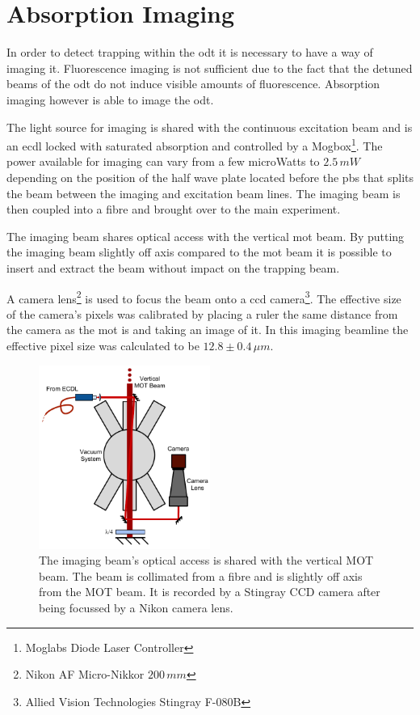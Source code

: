 \section{Absorption Imaging}

In order to detect trapping within the \gls{odt} it is necessary to have a way of imaging it. Fluorescence imaging is not sufficient due to the fact that the detuned beams of the \gls{odt} do not induce visible amounts of fluorescence. Absorption imaging however is able to image the \gls{odt}.

The light source for imaging is shared with the continuous excitation beam and is an \gls{ecdl} locked with saturated absorption and controlled by a Mogbox\footnote{Moglabs Diode Laser Controller}. The power available for imaging can vary from a few microWatts to $2.5\,\unit{mW}$ depending on the position of the half wave plate located before the \gls{pbs} that splits the beam between the imaging and excitation beam lines. The imaging beam is then coupled into a fibre and brought over to the main experiment.

The imaging beam shares optical access with the vertical \gls{mot} beam. By putting the imaging beam slightly off axis compared to the \gls{mot} beam it is possible to insert and extract the beam without impact on the trapping beam.

A camera lens\footnote{Nikon AF Micro-Nikkor $200\,\unit{mm}$} is used to focus the beam onto a \gls{ccd} camera\footnote{Allied Vision Technologies Stingray F-080B}. The effective size of the camera's pixels was calibrated by placing a ruler the same distance from the camera as the \gls{mot} is and taking an image of it. In this imaging beamline the effective pixel size was calculated to be $12.8\pm0.4\,\unit{\mu m}$.

\begin{figure}[h]
\centering
\includegraphics[width=0.5\textwidth]{figs/ImagingRig.pdf}
\caption{The imaging beam's optical access is shared with the vertical MOT beam. The beam is collimated from a fibre and is slightly off axis from the MOT beam. It is recorded by a Stingray CCD camera after being focussed by a Nikon camera lens.}
\label{fig:imaging_rig}
\end{figure}

